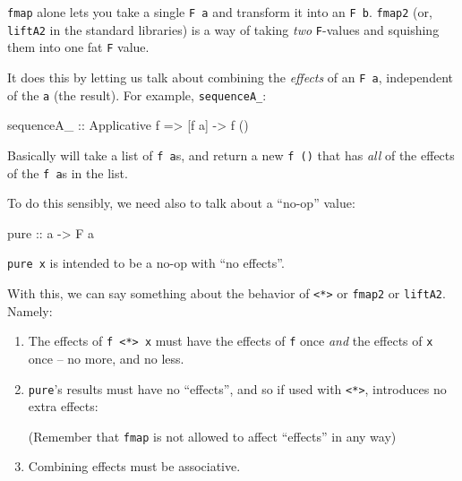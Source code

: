 \documentclass[]{article}
\newenvironment{Shaded}{}{}
\newcommand{\DataTypeTok}[1]{\textcolor[rgb]{0.56,0.13,0.00}{#1}}
\newcommand{\FunctionTok}[1]{\textcolor[rgb]{0.02,0.16,0.49}{#1}}
\newcommand{\NormalTok}[1]{#1}
\newcommand{\OtherTok}[1]{\textcolor[rgb]{0.00,0.44,0.13}{#1}}
\begin{document}
\texttt{fmap} alone lets you take a single \texttt{F\ a} and transform it into
an \texttt{F\ b}. \texttt{fmap2} (or, \texttt{liftA2} in the standard libraries)
is a way of taking \emph{two} \texttt{F}-values and squishing them into one fat
\texttt{F} value.

It does this by letting us talk about combining the \emph{effects} of an
\texttt{F\ a}, independent of the \texttt{a} (the result). For example,
\texttt{sequenceA\_}:

\begin{Shaded}
\begin{Highlighting}[]
\OtherTok{sequenceA_ ::} \DataTypeTok{Applicative}\NormalTok{ f }\OtherTok{=>}\NormalTok{ [f a] }\OtherTok{->}\NormalTok{ f ()}
\end{Highlighting}
\end{Shaded}

Basically will take a list of \texttt{f\ a}s, and return a new \texttt{f\ ()}
that has \emph{all} of the effects of the \texttt{f\ a}s in the list.

To do this sensibly, we need also to talk about a ``no-op'' value:

\begin{Shaded}
\begin{Highlighting}[]
\NormalTok{pure}\OtherTok{ ::}\NormalTok{ a }\OtherTok{->} \DataTypeTok{F}\NormalTok{ a}
\end{Highlighting}
\end{Shaded}

\texttt{pure\ x} is intended to be a no-op with ``no effects''.

With this, we can say something about the behavior of
\texttt{\textless{}*\textgreater{}} or \texttt{fmap2} or \texttt{liftA2}.
Namely:

\begin{enumerate}
\def\labelenumi{\arabic{enumi}.}
\item
  The effects of \texttt{f\ \textless{}*\textgreater{}\ x} must have the effects
  of \texttt{f} once \emph{and} the effects of \texttt{x} once -- no more, and
  no less.
\item
  \texttt{pure}'s results must have no ``effects'', and so if used with
  \texttt{\textless{}*\textgreater{}}, introduces no extra effects:

\begin{Shaded}
\end{Shaded}

  (Remember that \texttt{fmap} is not allowed to affect ``effects'' in any way)
\item
  Combining effects must be associative.
\end{enumerate}
\end{document}
